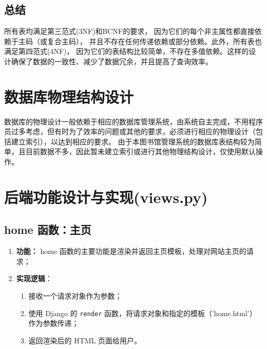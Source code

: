 \documentclass{ctexart}
\begin{document}
\subsection{总结}
所有表均满足第三范式(3NF)和BCNF的要求，
因为它们的每个非主属性都直接依赖于主码（或复合主码），
并且不存在任何传递依赖或部分依赖。此外，所有表也满足第四范式(4NF)，
因为它们的表结构比较简单，不存在多值依赖。这样的设计确保了数据的一致性、减少了数据冗余，并且提高了查询效率。
	\section{数据库物理结构设计}
	数据库的物理设计一般依赖于相应的数据库管理系统，由系统自主完成，不用程序员过多考虑，但有时为了效率的问题或其他的要求，必须进行相应的物理设计（包括建立索引），以达到相应的要求。
	由于本图书馆管理系统的数据库表结构较为简单，且目前数据不多，因此暂未建立索引或进行其他物理结构设计，仅使用默认操作。


                            
	\section{后端功能设计与实现(views.py)}
	\subsection{home 函数：主页}
	\begin{enumerate}
        \item \textbf{功能：} home 函数的主要功能是渲染并返回主页模板，处理对网站主页的请求；
        \item \textbf{实现逻辑}：
        \begin{enumerate}
            \item 接收一个请求对象作为参数；
            \item 使用 Django 的 \texttt{render} 函数，将请求对象和指定的模板（'home.html'）作为参数传递；
            \item 返回渲染后的 HTML 页面给用户。
        \end{enumerate}
    \end{enumerate}
    
\end{document}
